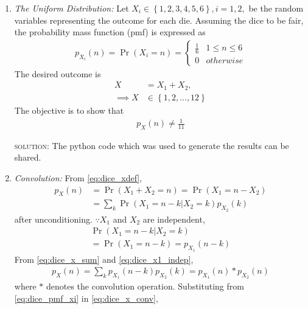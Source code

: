 \documentclass[12pt]{book}
\providecommand{\pr}[1]{\ensuremath{\Pr\left(#1\right)}}
\providecommand{\cbrak}[1]{\ensuremath{\left\{#1\right\}}}
\begin{document}
\begin{enumerate}
\item  {\em The Uniform Distribution: }Let $X_i \in \cbrak{1,2,3,4,5,6}, i = 1,2,$ be the random variables representing the outcome for each die.  Assuming the dice to be fair, the probability mass function (pmf) is expressed as 
\begin{align}
\label{eq:dice_pmf_xi}
p_{X_i}(n) = \pr{X_i = n} = 
\begin{cases}
\frac{1}{6} & 1 \le n \le 6
\\
0 & otherwise
\end{cases}
\end{align}
The desired outcome is
\begin{align}
\label{eq:dice_xdef}
X &= X_1 + X_2,
\\
\implies X &\in \cbrak{1,2,\dots,12}
\end{align}
%
The objective is to show that
\begin{align}
p_X(n) \ne \frac{1}{11}
\label{eq:dice_wrong}
\end{align}
\begin{flushleft}
\textsc{solution:}
The python code which was used to generate the results can be shared.
\end{flushleft}
\begin{center}
\end{center}
\item {\em Convolution: }
From \eqref{eq:dice_xdef},
\begin{align}
p_X(n) &= \pr{X_1 + X_2 = n} = \pr{X_1  = n -X_2}
\\
&= \sum_{k}^{}\pr{X_1  = n -k | X_2 = k}p_{X_2}(k)
\label{eq:dice_x_sum}
\end{align}%
after unconditioning.  $\because X_1$ and $X_2$ are independent,
\begin{multline}
\pr{X_1  = n -k | X_2 = k} 
\\
= \pr{X_1  = n -k} = p_{X_1}(n-k)
\label{eq:dice_x1_indep}
\end{multline}
From \eqref{eq:dice_x_sum} and \eqref{eq:dice_x1_indep},
\begin{align}
p_X(n) = \sum_{k}^{}p_{X_1}(n-k)p_{X_2}(k) = p_{X_1}(n)*p_{X_2}(n)
\label{eq:dice_x_conv}
\end{align}
where $*$ denotes the convolution operation. 
Substituting from \eqref{eq:dice_pmf_xi}
in \eqref{eq:dice_x_conv},

\end{enumerate}
\end{document}

